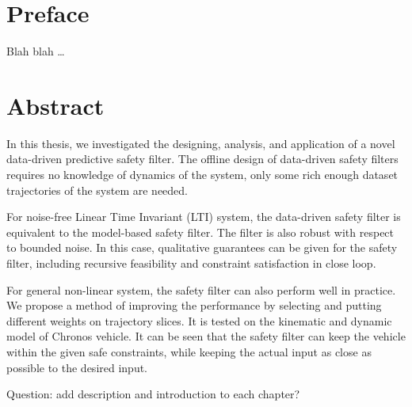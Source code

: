 
\chapter*{Preface}

Blah blah \dots

 \cleardoublepage


 \setcounter{tocdepth}{2}
 \tableofcontents

 \cleardoublepage


\chapter*{Abstract}

In this thesis, we investigated the designing, analysis, and application of a novel data-driven predictive safety filter.
The offline design of data-driven safety filters requires no knowledge of dynamics of the system, only some rich enough dataset trajectories of the system are needed.

For noise-free Linear Time Invariant (LTI) system, the data-driven safety filter is equivalent to the model-based safety filter.
The filter is also robust with respect to bounded noise.
In this case, qualitative guarantees can be given for the safety filter, including recursive feasibility and constraint satisfaction in close loop.

For general non-linear system, the safety filter can also perform well in practice.
We propose a method of improving the performance by selecting and putting different weights on trajectory slices.
It is tested on the kinematic and dynamic model of Chronos vehicle.
It can be seen that the safety filter can keep the vehicle within the given safe constraints, while keeping the actual input as close as possible to the desired input.

Question: add description and introduction to each chapter?

